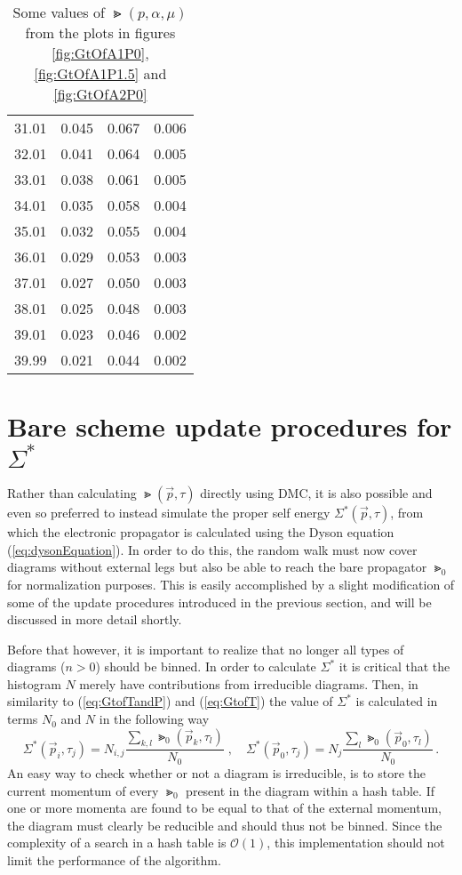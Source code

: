 \begin{table}[H]
\begin{center}
\begin{tabular}{r | c | c | c}
31.01 & 0.045 & 0.067 & 0.006 \\
32.01 & 0.041 & 0.064 & 0.005 \\
33.01 & 0.038 & 0.061 & 0.005 \\
34.01 & 0.035 & 0.058 & 0.004 \\
35.01 & 0.032 & 0.055 & 0.004 \\
36.01 & 0.029 & 0.053 & 0.003 \\
37.01 & 0.027 & 0.050 & 0.003 \\
38.01 & 0.025 & 0.048 & 0.003 \\
39.01 & 0.023 & 0.046 & 0.002 \\
39.99 & 0.021 & 0.044 & 0.002 \\
		\end{tabular}
	\end{center}
	\caption{Some values of $ \Gt(p, \alpha, \mu) $ from the plots in figures \ref{fig:GtOfA1P0}, \ref{fig:GtOfA1P1.5} and \ref{fig:GtOfA2P0}}
	\label{tab:truthTables}   
\end{table}

\section{Bare scheme update procedures for $ \Sigma^* $}

Rather than calculating $ \Gt(\vec p, \tau) $ directly using DMC, it is also possible and even so preferred  to instead simulate the proper self energy $ \Sigma^*(\vec p, \tau) $, from which the electronic propagator is calculated using the Dyson equation (\ref{eq:dysonEquation}).
In order to do this, the random walk must now cover diagrams without external legs but also be able to reach the bare propagator $ \Gt_0 $ for normalization purposes. This is easily accomplished by a slight modification of some of the update procedures introduced in the previous section, and will be discussed in more detail shortly.

Before that however, it is important to realize that no longer all types of diagrams ($ n > 0 $) should be binned. In order to calculate $ \Sigma^* $ it is critical that the histogram $ N $ merely have contributions from irreducible diagrams. Then, in similarity to (\ref{eq:GtofTandP}) and (\ref{eq:GtofT}) the value of $ \Sigma^* $ is calculated in terms $ N_0 $ and $ N $ in the following way
\begin{equation}
	\Sigma^* (\vec p_i, \tau_j) = N_{i,j} \frac{\sum_{k,l} \Gt_0 (\vec p_k, \tau_l)}{N_0}
	\; , \quad
	\Sigma^* (\vec p_0, \tau_j) = N_{j} \frac{\sum_{l} \Gt_0 (\vec p_0, \tau_l)}{N_0} \,.
\end{equation}
An easy way to check whether or not a diagram is irreducible, is to store the current momentum of every $ \Gt_0 $ present in the diagram within a hash table. If one or more momenta are found to be equal to that of the external momentum, the diagram must clearly be reducible and should thus not be binned. Since the complexity of a search in a hash table is $ \mathcal{O}(1) $, this implementation should not limit the performance of the algorithm.


